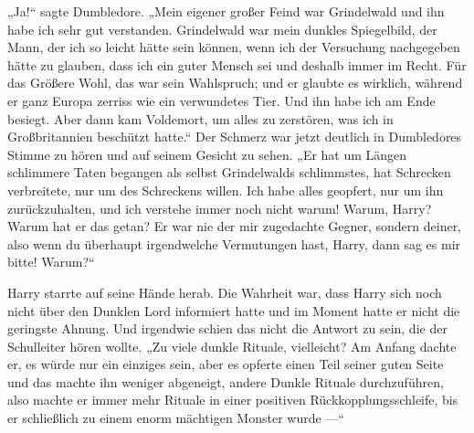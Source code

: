 „Ja!“ sagte Dumbledore.
„Mein eigener großer Feind war Grindelwald und ihn habe ich sehr gut verstanden. Grindelwald war mein dunkles Spiegelbild, der Mann, der ich so leicht hätte sein können, wenn ich der Versuchung nachgegeben hätte zu glauben, dass ich ein guter Mensch sei und deshalb immer im Recht. Für das Größere Wohl, das war sein Wahlspruch; und er glaubte es wirklich, während er ganz Europa zerriss wie ein verwundetes Tier. Und ihn habe ich am Ende besiegt. Aber dann kam Voldemort, um alles zu zerstören, was ich in Großbritannien beschützt hatte.“ Der Schmerz war jetzt deutlich in Dumbledores Stimme zu hören und auf seinem Gesicht zu sehen.
„Er hat um Längen schlimmere Taten begangen als selbst Grindelwalds schlimmstes, hat Schrecken verbreitete, nur um des Schreckens willen. Ich habe alles geopfert, nur um ihn zurückzuhalten, und ich verstehe immer noch nicht warum! Warum, Harry? Warum hat er das getan? Er war nie der mir zugedachte Gegner, sondern deiner, also wenn du überhaupt irgendwelche Vermutungen hast, Harry, dann sag es mir bitte! Warum?“

Harry starrte auf seine Hände herab. Die Wahrheit war, dass Harry sich noch nicht über den Dunklen Lord informiert hatte und im Moment hatte er nicht die geringste Ahnung. Und irgendwie schien das nicht die Antwort zu sein, die der Schulleiter hören wollte.
„Zu viele dunkle Rituale, vielleicht? Am Anfang dachte er, es würde nur ein einziges sein, aber es opferte einen Teil seiner guten Seite und das machte ihn weniger abgeneigt, andere Dunkle Rituale durchzuführen, also machte er immer mehr Rituale in einer positiven Rückkopplungsschleife, bis er schließlich zu einem enorm mächtigen Monster wurde —“

